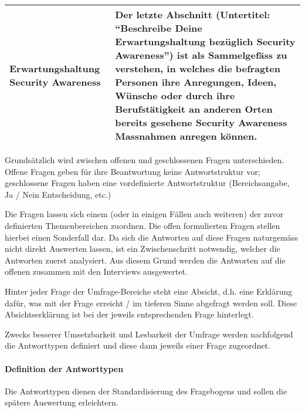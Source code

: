 \documentclass[../../main.tex]{subfiles}
\begin{document}
\begin{table}[H]
\begin{tabular}{ |p{3cm}|p{12.5cm}|}
\hline
\textbf{Erwartungshaltung \newline Security Awareness}                &  Der letzte Abschnitt (Untertitel: "`Beschreibe Deine Erwartungshaltung bezüglich Security Awareness"') ist als Sammelgefäss zu verstehen, in welches die befragten Personen ihre Anregungen, Ideen, Wünsche oder durch ihre Berufstätigkeit an anderen Orten bereits gesehene Security Awareness Massnahmen anregen können. \\
\hline

\end{tabular}
\end{table}

\begin{sloppypar}
Grundsätzlich wird zwischen offenen und geschlossenen Fragen unterschieden. Offene Fragen geben für ihre Beantwortung keine Antwortstruktur vor; geschlossene Fragen haben eine vordefinierte Antwortstruktur (Bereichsangabe, Ja / Nein Entscheidung, etc.)

Die Fragen lassen sich einem (oder in einigen Fällen auch weiteren) der zuvor definierten Themenbereichen zuordnen. Die offen formulierten Fragen stellen hierbei einen Sonderfall dar. Da sich die Antworten auf diese Fragen naturgemäss nicht direkt Auswerten lassen, ist ein Zwischenschritt notwendig, welcher die Antworten zuerst analysiert. Aus diesem Grund werden die Antworten auf die offenen zusammen mit den Interviews ausgewertet\footnotemark.
 
Hinter jeder Frage der Umfrage-Bereiche steht eine Absicht, d.h. eine Erklärung dafür, was mit der Frage erreicht / im tieferen Sinne abgefragt werden soll. Diese Absichtserklärung ist bei der jeweils entsprechenden Frage hinterlegt. 

Zwecks besserer Umsetzbarkeit und Lesbarkeit der Umfrage werden nachfolgend die Antworttypen definiert und diese dann jeweils einer Frage zugeordnet.

\end{sloppypar}


\paragraph*{Definition der Antworttypen}\mbox{}

\begin{sloppypar}
Die Antworttypen dienen der Standardisierung des Fragebogens und sollen die spätere Auswertung erleichtern.

\end{sloppypar}
\end{document}
